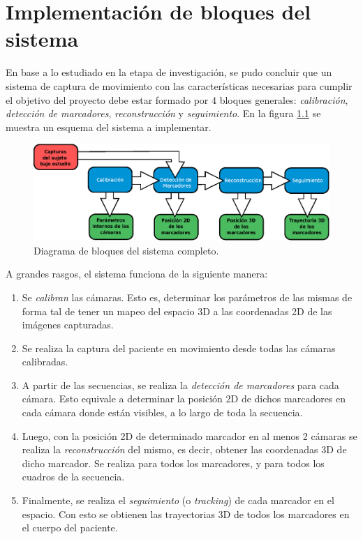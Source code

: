 \chapter{Implementación de bloques del sistema}
\label{sec:implementacion_bloques_sistema}


En base a lo estudiado en la etapa de investigación, se pudo concluir que un sistema de captura de movimiento con las características necesarias para cumplir el objetivo del proyecto debe estar formado por 4 bloques generales: \emph{calibración}, \emph{detección de marcadores}, \emph{reconstrucción} y \emph{seguimiento}. En la figura \ref{bloquesSist} se muestra un esquema del sistema a implementar.

\begin{figure}[ht!]
\hspace{-0.5cm}
\includegraphics[scale=0.7]{img/Sistema_completo/Diagrama_de_bloques.eps}
\caption{Diagrama de bloques del sistema completo.}
\label{bloquesSist}
\end{figure}

A grandes rasgos, el sistema funciona de la siguiente manera:

\begin{enumerate}
	\item Se \emph{calibran} las cámaras. Esto es, determinar los parámetros de las mismas de forma tal de tener un mapeo del espacio 3D a las coordenadas 2D de las imágenes capturadas.
	\item Se realiza la captura del paciente en movimiento desde todas las cámaras calibradas.
	\item A partir de las secuencias, se realiza la \emph{detección de marcadores} para cada cámara. Esto equivale a determinar la posición 2D de dichos marcadores en cada cámara donde están visibles, a lo largo de toda la secuencia.
	\item Luego, con la posición 2D de determinado marcador en al menos 2 cámaras se realiza la \emph{reconstrucción} del mismo, es decir, obtener las coordenadas 3D de dicho marcador. Se realiza para todos los marcadores, y para todos los cuadros de la secuencia.
	\item Finalmente, se realiza el \emph{seguimiento} (o \emph{tracking}) de cada marcador en el espacio. Con esto se obtienen las trayectorias 3D de todos los marcadores en el cuerpo del paciente.
\end{enumerate}

